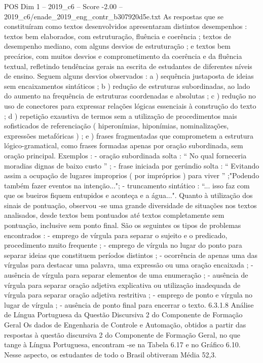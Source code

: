 \begin{textsample}{POS Dim 1 – 2019\_c6 – Score -2.00 – 2019\_c6/enade\_2019\_eng\_contr\_b307920d5e.txt}
As respostas que se constituíram como textos desenvolvidos apresentaram distintos desempenhos : textos bem elaborados, com estruturação, fluência e coerência ; textos de desempenho mediano, com alguns desvios de estruturação ; e textos bem precários, com muitos desvios e comprometimento da coerência e da fluência textual, refletindo tendências gerais na escrita de estudantes de diferentes níveis de ensino.
Seguem alguns desvios observados : a ) sequência justaposta de ideias sem encaixamentos sintáticos ; b ) redução de estruturas subordinadas, ao lado do aumento na frequência de estruturas coordenadas e absolutas ; c ) redução no uso de conectores para expressar relações lógicas essenciais à construção do texto ; d ) repetição exaustiva de termos sem a utilização de procedimentos mais sofisticados de referenciação ( hiperonímias, hiponímias, nominalizações, expressões metafóricas ) ; e ) frases fragmentadas que comprometem a estrutura lógico-gramatical, como frases formadas apenas por oração subordinada, sem oração principal.
Exemplos : - oração subordinada solta : “ No qual forneceria moradias dignas de baixo custo ” ; - frase iniciada por gerúndio solta : “ Evitando assim a ocupação de lugares improprios ( por impróprios ) para viver ” ;"Podendo também fazer eventos na intenção..."; - truncamento sintático : “... isso faz com que os bueiros fiquem entupidos e aconteça e a água...".
Quanto à utilização dos sinais de pontuação, observou -se uma grande diversidade de situações nos textos analisados, desde textos bem pontuados até textos completamente sem pontuação, inclusive sem ponto final.
São os seguintes os tipos de problemas encontrados : - emprego de vírgula para separar o sujeito e o predicado, procedimento muito frequente ; - emprego de vírgula no lugar do ponto para separar ideias que constituem períodos distintos ; - ocorrência de apenas uma das vírgulas para destacar uma palavra, uma expressão ou uma oração encaixada ; - ausência de vírgula para separar elementos de uma enumeração ; - ausência de vírgula para separar oração adjetiva explicativa ou utilização inadequada de vírgula para separar oração adjetiva restritiva ; - emprego de ponto e vírgula no lugar de vírgula ; - ausência de ponto final para encerrar o texto. 6.3.1.8 Análise de Língua Portuguesa da Questão Discursiva 2 do Componente de Formação Geral Os dados de Engenharia de Controle e Automação, obtidos a partir das respostas à questão discursiva 2 do Componente de Formação Geral, no que tange à Língua Portuguesa, encontram -se na Tabela 6.17 e no Gráfico 6.10.
Nesse aspecto, os estudantes de todo o Brasil obtiveram Média 52,3.

\end{textsample}
